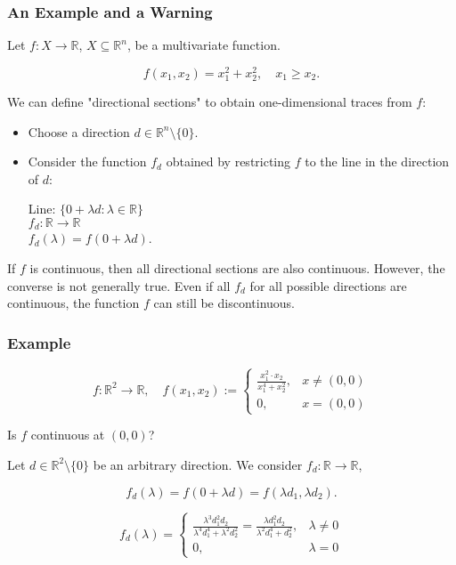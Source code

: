 \documentclass{article}
\begin{document}
\subsubsection*{An Example and a Warning}

Let \( f: X \rightarrow \mathbb{R} \), \( X \subseteq \mathbb{R}^n \), be a multivariate function.

\[
f(x_1, x_2) = x_1^2 + x_2^2, \quad x_1 \geq x_2.
\]

We can define "directional sections" to obtain one-dimensional traces from \( f \):

\begin{itemize}
    \item Choose a direction \( d \in \mathbb{R}^n \setminus \{0\} \).
    \item Consider the function \( f_d \) obtained by restricting \( f \) to the line in the direction of \( d \):
    
    Line: \( \{0 + \lambda d : \lambda \in \mathbb{R}\} \) \\
    \( f_d: \mathbb{R} \rightarrow \mathbb{R} \) \\
    \( f_d(\lambda) = f(0 + \lambda d) \).
\end{itemize}

If \( f \) is continuous, then all directional sections are also continuous. However, the converse is not generally true. Even if all \( f_d \) for all possible directions are continuous, the function \( f \) can still be discontinuous.

\subsubsection*{Example}

\[
f: \mathbb{R}^2 \rightarrow \mathbb{R}, \quad f(x_1, x_2) := 
\begin{cases} 
\frac{x_1^2 \cdot x_2}{x_1^4 + x_2^2}, & x \neq (0, 0) \\ 
0, & x = (0, 0) 
\end{cases}
\]

Is \( f \) continuous at \( (0, 0) \)?

Let \( d \in \mathbb{R}^2 \setminus \{0\} \) be an arbitrary direction. We consider \( f_d: \mathbb{R} \rightarrow \mathbb{R} \),

\[
f_d(\lambda) = f(0 + \lambda d) = f(\lambda d_1, \lambda d_2).
\]

\[
f_d(\lambda) = 
\begin{cases} 
\frac{\lambda^3 d_1^2 d_2}{\lambda^4 d_1^4 + \lambda^2 d_2^2} = \frac{\lambda d_1^2 d_2}{\lambda^2 d_1^4 + d_2^2}, & \lambda \neq 0 \\ 
0, & \lambda = 0 
\end{cases}
\]
\end{document}
